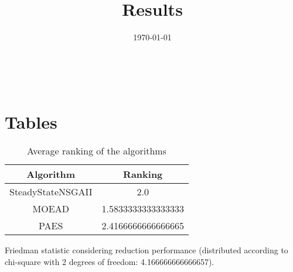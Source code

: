\documentclass{article}
\title{Results}
\author{}
\date{\today}
\begin{document}
\oddsidemargin 0in \topmargin 0in\maketitle
\
\section{Tables}
\begin{table}[!htp]
\centering
\caption{Average ranking of the algorithms}
\begin{tabular}{c|c}
Algorithm&Ranking\\
\hline
SteadyStateNSGAII&2.0\\
MOEAD&1.5833333333333333\\
PAES&2.4166666666666665\\
\end{tabular}
\end{table}


Friedman statistic considering reduction performance (distributed according to chi-square with 2 degrees of freedom: 4.166666666666657).
\end{document}
